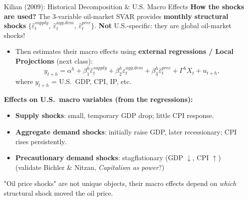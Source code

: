 \documentclass{beamer}
\begin{document}
\begin{frame}{Kilian (2009): Historical Decomposition \& U.S. Macro Effects}
\footnotesize
\textbf{How the shocks are used?} The 3-variable oil-market SVAR provides \textbf{monthly structural shocks} $ \{\widehat{\varepsilon}^{supply}_t,\ \widehat{\varepsilon}^{agg.dem}_t,\ 
     \widehat{\varepsilon}^{prec}_t\}.$  \textbf{Not} U.S.-specific: they are global oil-market shocks!

\begin{itemize}
  \item Then estimates their macro effects using \textbf{external regressions / Local Projections} (next class):
  \[
  y_{t+h} = \alpha^h
  + \beta_1^h \widehat{\varepsilon}^{supply}_t
  + \beta_2^h \widehat{\varepsilon}^{agg.dem}_t
  + \beta_3^h \widehat{\varepsilon}^{prec}_t
  + \Gamma^h X_t + u_{t+h},
  \]
  where $y_{t+h}$ = U.S.\ GDP, CPI, IP, etc.
\end{itemize}


\textbf{Effects on U.S.\ macro variables (from the regressions):}
\begin{itemize}
  \item \textbf{Supply shocks}: small, temporary GDP drop; little CPI response.
  \item \textbf{Aggregate demand shocks}: initially raise GDP, later recessionary; CPI rises persistently.
  \item \textbf{Precautionary demand shocks}: stagflationary (GDP $\downarrow$, CPI $\uparrow$) (validate Bichler \& Nitzan, \textit{Capitalism as power}?)
\end{itemize}

"Oil price shocks" are not unique objects, their macro effects depend on
\textit{which} structural shock moved the oil price.
\end{frame}
\end{document}
